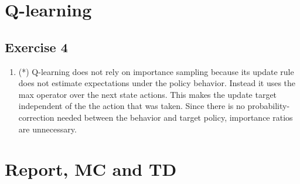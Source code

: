 \documentclass{article}
\begin{document}
\section{Q-learning}
\subsection*{Exercise 4}
\begin{enumerate}
    \item (*) Q-learning does not rely on importance sampling because its update rule does not estimate expectations under the policy behavior. Instead it uses the max operator over the next state actions. This makes the update target independent of the the action that was taken. Since there is no probability-correction needed between the behavior and target policy, importance ratios are unnecessary.
\end{enumerate}
    


\section{Report, MC and TD}
\end{document}
